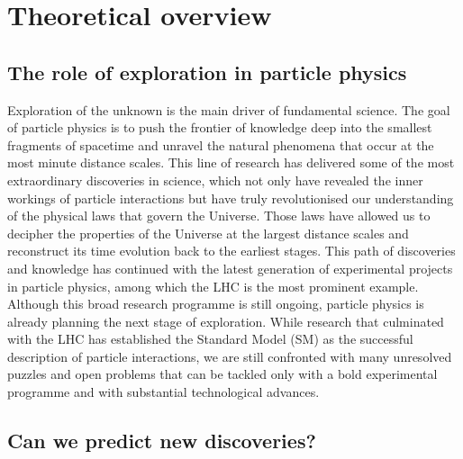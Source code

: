 \documentclass[../report.tex]{subfiles}
\begin{document}
\baselineskip=14pt
\linenumbers
\chapter{Theoretical overview}
\label{chap:th}
\section*{The role of exploration in particle physics}

Exploration of the unknown is the main driver of fundamental science. 
  The goal of particle physics is to push the frontier of knowledge deep into the smallest fragments of spacetime and unravel the natural phenomena that occur at the most minute distance scales. This line of research has delivered some of the most extraordinary discoveries in science, which not only have revealed the inner workings of particle interactions but have truly revolutionised our understanding of the physical laws that govern the Universe. Those laws have allowed us to decipher the properties of the Universe at the largest distance scales and reconstruct its time evolution back to the earliest stages. This path of discoveries and knowledge has continued with the latest generation of experimental projects in particle physics, among which the LHC is the most prominent example. Although this broad research programme is still ongoing, particle physics is already planning the next stage of exploration. While research that culminated with the LHC has established the Standard Model (SM) as the successful description of particle interactions, we are still confronted with many unresolved puzzles and open problems that can be tackled only with a bold experimental programme and with substantial technological advances.


\section*{Can we predict new discoveries?}
\end{document}
